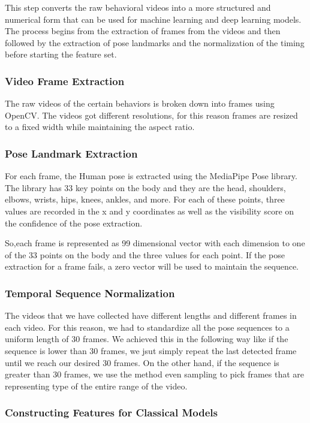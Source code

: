 This step converts the raw behavioral videos into a more structured and numerical form that can be used for machine learning and deep learning models. The process begins from the extraction of frames from the videos and then followed by the extraction of pose landmarks and the normalization of the timing before starting the feature set.

\subsubsection{Video Frame Extraction}

The raw videos of the certain behaviors is broken down into frames using OpenCV. The videos got different resolutions, for this reason frames are resized to a fixed width while maintaining the aspect ratio.  

\subsubsection{Pose Landmark Extraction}

For each frame, the Human pose is extracted using the MediaPipe Pose library. The library has 33 key points on the body and they are the head, shoulders, elbows, wrists, hips, knees, ankles, and more. For each of these points, three values are recorded in the x and y coordinates as well as the visibility score on the confidence of the pose extraction.

So,each frame is represented as 99 dimensional vector with each dimension to one of the 33 points on the body and the three values for each point. If the pose extraction for a frame fails, a zero vector will be used to maintain the sequence.

\subsubsection{Temporal Sequence Normalization}
The videos that we have collected have different lengths and different frames in each video. For this reason, we had to standardize all the pose sequences to a uniform length of 30 frames. We achieved this in the following way like if the sequence is lower than 30 frames, we jsut simply repeat the last detected frame until we reach our desired 30 frames. On the other hand, if the sequence is greater than 30 frames, we use the method even sampling to pick frames that are representing type of the entire range of the video.

\subsubsection{Constructing Features for Classical Models}

